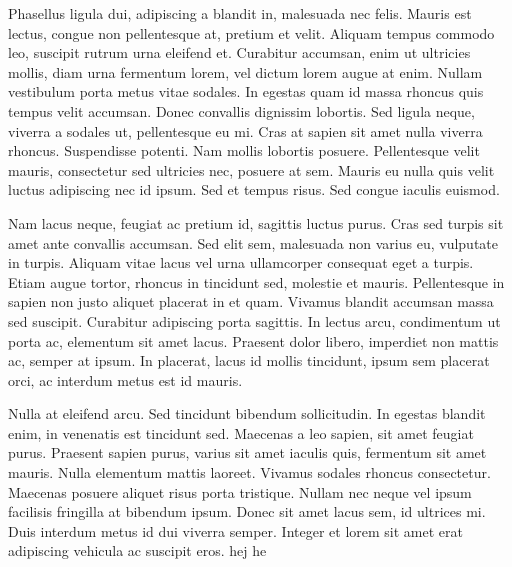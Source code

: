 Phasellus ligula dui, adipiscing a blandit in, malesuada nec felis. Mauris est lectus, congue non pellentesque at, pretium et velit. Aliquam tempus commodo leo, suscipit rutrum urna eleifend et. Curabitur accumsan, enim ut ultricies mollis, diam urna fermentum lorem, vel dictum lorem augue at enim. Nullam vestibulum porta metus vitae sodales. In egestas quam id massa rhoncus quis tempus velit accumsan. Donec convallis dignissim lobortis. Sed ligula neque, viverra a sodales ut, pellentesque eu mi. Cras at sapien sit amet nulla viverra rhoncus. Suspendisse potenti. Nam mollis lobortis posuere. Pellentesque velit mauris, consectetur sed ultricies nec, posuere at sem. Mauris eu nulla quis velit luctus adipiscing nec id ipsum. Sed et tempus risus. Sed congue iaculis euismod.

Nam lacus neque, feugiat ac pretium id, sagittis luctus purus. Cras sed turpis sit amet ante convallis accumsan. Sed elit sem, malesuada non varius eu, vulputate in turpis. Aliquam vitae lacus vel urna ullamcorper consequat eget a turpis. Etiam augue tortor, rhoncus in tincidunt sed, molestie et mauris. Pellentesque in sapien non justo aliquet placerat in et quam. Vivamus blandit accumsan massa sed suscipit. Curabitur adipiscing porta sagittis. In lectus arcu, condimentum ut porta ac, elementum sit amet lacus. Praesent dolor libero, imperdiet non mattis ac, semper at ipsum. In placerat, lacus id mollis tincidunt, ipsum sem placerat orci, ac interdum metus est id mauris.

Nulla at eleifend arcu. Sed tincidunt bibendum sollicitudin. In egestas blandit enim, in venenatis est tincidunt sed. Maecenas a leo sapien, sit amet feugiat purus. Praesent sapien purus, varius sit amet iaculis quis, fermentum sit amet mauris. Nulla elementum mattis laoreet. Vivamus sodales rhoncus consectetur. Maecenas posuere aliquet risus porta tristique. Nullam nec neque vel ipsum facilisis fringilla at bibendum ipsum. Donec sit amet lacus sem, id ultrices mi. Duis interdum metus id dui viverra semper. Integer et lorem sit amet erat adipiscing vehicula ac suscipit eros. 
hej he
